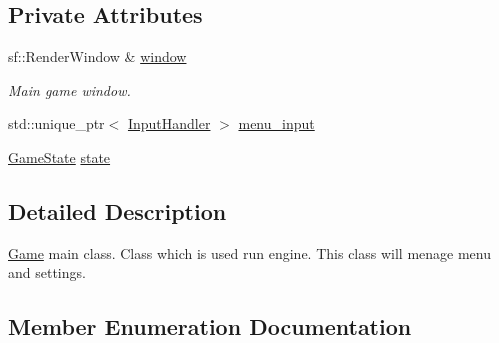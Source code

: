 \subsection*{Private Attributes}
\begin{DoxyCompactItemize}
\item 
sf\+::\+Render\+Window \& \hyperlink{class_game_ad0fb4d8653dcf289fd6573cf5ba0f3d1}{window}
\begin{DoxyCompactList}\small\item\em Main game window. \end{DoxyCompactList}\item 
std\+::unique\+\_\+ptr$<$ \hyperlink{class_input_handler}{Input\+Handler} $>$ \hyperlink{class_game_a82776f65732ac43cf35b8b7c7120c873}{menu\+\_\+input}
\item 
\hyperlink{class_game_a7f57a7a8408e554d0a72882c287e1d04}{Game\+State} \hyperlink{class_game_ad9fc2a8710ee56916f79314b91112ed0}{state}
\end{DoxyCompactItemize}


\subsection{Detailed Description}
\hyperlink{class_game}{Game} main class. Class which is used run engine. This class will menage menu and settings. 

\subsection{Member Enumeration Documentation}
\hypertarget{class_game_a7f57a7a8408e554d0a72882c287e1d04}{}
